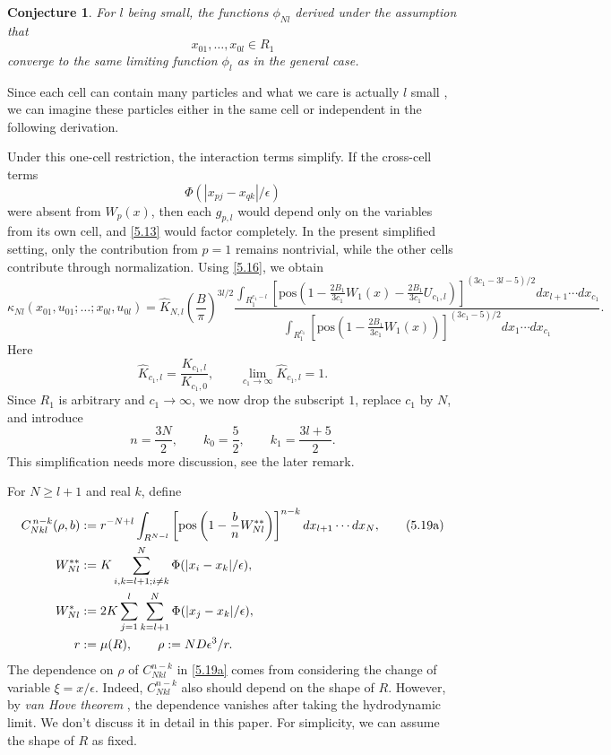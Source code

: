 \documentclass[11pt]{article}
\newtheorem{conjecture}{Conjecture}
\begin{document}
\begin{conjecture}\label{conj:cell}
For $l$ being small, the functions $\phi_{Nl}$ derived under the assumption that
\[
x_{01},\dots,x_{0l}\in R_1
\]
converge to the same limiting function $\phi_l$ as in the general case.
\end{conjecture}
Since each cell can contain many particles and what we care is actually $l$ small , we can imagine these particles either in the same cell or independent in the following derivation.

Under this one-cell restriction, the interaction terms simplify. If the cross-cell terms
\[
\Phi(|x_{pj}-x_{qk}|/\epsilon)
\]
were absent from $W_p(x)$, then each $g_{p,l}$ would depend only on the variables from its own cell, and \eqref{5.13} would factor completely. In the present simplified setting, only the contribution from $p=1$ remains nontrivial, while the other cells contribute through normalization. Using \eqref{5.16}, we obtain
\begin{equation}
\kappa_{Nl}(x_{01},u_{01};\dots;x_{0l},u_{0l})
=
\hat K_{N,l}
\left(\frac{B}{\pi}\right)^{3l/2}
\frac{
\displaystyle
\int_{R_1^{c_1-l}}
\left[
\mathrm{pos}
\left(
1-\frac{2B_1}{3c_1}W_1(x)-\frac{2B_1}{3c_1}U_{c_1,l}
\right)
\right]^{(3c_1-3l-5)/2}
dx_{l+1}\cdots dx_{c_1}
}{
\displaystyle
\int_{R_1^{c_1}}
\left[
\mathrm{pos}
\left(
1-\frac{2B_1}{3c_1}W_1(x)
\right)
\right]^{(3c_1-5)/2}
dx_1\cdots dx_{c_1}
}.
\tag{5.17}\label{5.17}
\end{equation}
Here
\[
\hat K_{c_1,l}=\frac{K_{c_1,l}}{K_{c_1,0}},
\qquad
\lim_{c_1\to\infty}\hat K_{c_1,l}=1.
\]
Since $R_1$ is arbitrary and $c_1\to\infty$, we now drop the subscript $1$, replace $c_1$ by $N$, and introduce
\begin{equation}
n=\frac{3N}{2},
\qquad
k_0=\frac52,
\qquad
k_1=\frac{3l+5}{2}.
\tag{5.18}\label{5.18}
\end{equation}
This simplification needs more discussion, see the later remark.

For $N\ge l+1$ and real $k$, define
\begin{align}
C^{\,n-k}_{Nkl}(\rho,b)
&:=
r^{-N+l}
\int_{R^{N-l}}
\left[
\mathrm{pos}
\left(
1-\frac{b}{n}W_{Nl}^{**}
\right)
\right]^{n-k}
dx_{l+1}\cdots dx_N,
\tag{5.19a}\label{5.19a}\\
W_{Nl}^{**}
&:=
K\sum_{i,k=l+1;i\neq k}^N
\Phi(|x_i-x_k|/\epsilon),
\notag\\
W_{Nl}^{*}
&:=
2K\sum_{j=1}^l\sum_{k=l+1}^N
\Phi(|x_j-x_k|/\epsilon),
\notag\\
r&:=\mu(R),
\qquad
\rho:=ND\epsilon^3/r.
\notag
\end{align}
The dependence on $\rho$ of $C_{Nkl}^{n-k}$ in \eqref{5.19a} comes from considering the change of variable $\xi=x/\epsilon$. Indeed, $C_{Nkl}^{n-k}$ also should depend on the shape of $R$. However, by \emph{van Hove theorem} \cite{Ruelle1969}, the dependence vanishes after taking the hydrodynamic limit. We don't discuss it in detail in this paper. For simplicity, we can assume the shape of $R$ as fixed.
\end{document}
